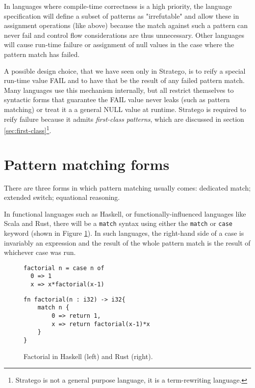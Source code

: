 \documentclass[acmsmall]{acmart}
\begin{document}
In languages where compile-time correctness is a high priority, the language specification will define a subset of patterns as "irrefutable" and allow these in assignment operations (like above) because the match against such a pattern can never fail and control flow considerations are thus unnecessary.  Other languages will cause run-time failure or assignment of null values in the case where the pattern match has failed.

A possible design choice, that we have seen only in Stratego, is to reify a special run-time value FAIL and to have that be the result of any failed pattern match.  Many languages use this mechanism internally, but all restrict themselves to syntactic forms that guarantee the FAIL value never leaks (such as pattern matching) or treat it a a general NULL value at runtime.  Stratego is required to reify failure because it admits \emph{first-class patterns}, which are discussed in section \ref{sec:first-class}\footnote{Stratego is not a general purpose language, it is a term-rewriting language.}.

\section{Pattern matching forms}
There are three forms in which pattern matching usually comes: dedicated match; extended switch; equational reasoning.

In functional languages such as Haskell, or functionally-influenced languages like Scala and Rust, there will be a \lstinline{match} syntax using either the \lstinline{match} or \lstinline{case} keyword (shown in Figure \ref{lst:haskell_rust}).  In such languages, the right-hand side of a case is invariably an expression and the result of the whole pattern match is the result of whichever case was run.

\begin{figure}
\hspace{-2em}
\begin{minipage}[t]{0.35\linewidth}
\begin{lstlisting}
factorial n = case n of
  0 => 1
  x => x*factorial(x-1)    
\end{lstlisting}
\end{minipage}\hspace{2em}
\begin{minipage}[t]{0.55\linewidth}
\begin{lstlisting}
fn factorial(n : i32) -> i32{
    match n {
        0 => return 1,
        x => return factorial(x-1)*x
    }
}
\end{lstlisting}
\end{minipage}
\caption{Factorial in Haskell (left) and Rust (right).}
\label{lst:haskell_rust}
\end{figure}
\end{document}
